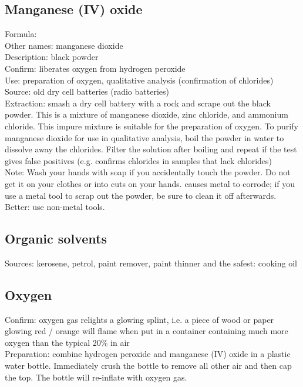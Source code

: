 \subsection{Manganese (IV) oxide}
Formula: \\
Other names: manganese dioxide\\
Description: black powder\\
Confirm: liberates oxygen from hydrogen peroxide\\
Use: preparation of oxygen, 
qualitative analysis (confirmation of chlorides)\\
Source: old dry cell batteries (radio batteries)\\
Extraction: smash a dry cell battery with a rock 
and scrape out the black powder. 
This is a mixture of manganese dioxide, 
zinc chloride, 
and ammonium chloride. 
This impure mixture is suitable for the preparation of oxygen. 
To purify manganese dioxide for use in qualitative analysis, 
boil the powder in water to dissolve away the chlorides. 
Filter the solution after boiling 
and repeat if the test gives false positives (e.g. 
confirms chlorides in samples that lack chlorides)\\
Note: Wash your hands with soap if you accidentally touch the powder. 
Do not get it on your clothes or into cuts on your hands. 
 causes metal to corrode; 
if you use a metal tool to scrap out the powder, 
be sure to clean it off afterwards. 
Better: use non-metal tools. 
\subsection{Organic solvents}
Sources: kerosene, 
petrol, 
paint remover, 
paint thinner and the safest: cooking oil
\subsection{Oxygen}
Confirm: oxygen gas relights a glowing splint, 
i.e. 
a piece of wood or paper glowing red / orange 
will flame when put in a container 
containing much more oxygen than the typical 20\% in air\\
Preparation: combine hydrogen peroxide 
and manganese (IV) oxide in a plastic water bottle. 
Immediately crush the bottle to remove all other air and then cap the top. 
The bottle will re-inflate with oxygen gas.
